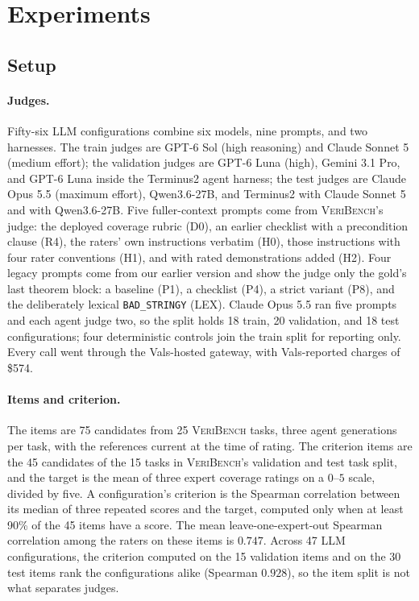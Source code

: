 \section{Experiments}\label{sec:experiments}
\subsection{Setup}\label{sec:setup}
\paragraph{Judges.}
Fifty-six LLM configurations combine six models, nine prompts, and two harnesses.
The train judges are GPT-6 Sol (high reasoning) and Claude Sonnet 5 (medium effort); the validation judges are GPT-6 Luna (high), Gemini 3.1 Pro, and GPT-6 Luna inside the Terminus2 agent harness; the test judges are Claude Opus 5.5 (maximum effort), Qwen3.6-27B, and Terminus2 with Claude Sonnet 5 and with Qwen3.6-27B.
Five fuller-context prompts come from \textsc{VeriBench}'s judge: the deployed coverage rubric (D0), an earlier checklist with a precondition clause (R4), the raters' own instructions verbatim (H0), those instructions with four rater conventions (H1), and with rated demonstrations added (H2).
Four legacy prompts come from our earlier version and show the judge only the gold's last theorem block: a baseline (P1), a checklist (P4), a strict variant (P8), and the deliberately lexical \texttt{BAD\_STRINGY} (LEX).
Claude Opus 5.5 ran five prompts and each agent judge two, so the split holds 18 train, 20 validation, and 18 test configurations; four deterministic controls join the train split for reporting only.
Every call went through the Vals-hosted gateway, with Vals-reported charges of \$574.

\paragraph{Items and criterion.}
The items are 75 candidates from 25 \textsc{VeriBench} tasks, three agent generations per task, with the references current at the time of rating.
The criterion items are the 45 candidates of the 15 tasks in \textsc{VeriBench}'s validation and test task split, and the target is the mean of three expert coverage ratings on a $0$--$5$ scale, divided by five.
A configuration's criterion is the Spearman correlation between its median of three repeated scores and the target, computed only when at least 90\% of the 45 items have a score.
The mean leave-one-expert-out Spearman correlation among the raters on these items is $0.747$.
Across 47 LLM configurations, the criterion computed on the 15 validation items and on the 30 test items rank the configurations alike (Spearman $0.928$), so the item split is not what separates judges.

